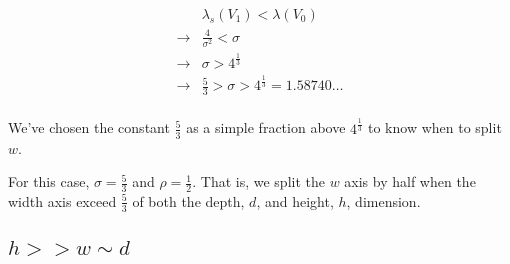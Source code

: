 $$
\begin{array}{ll}
  & \lambda_s (V_1) < \lambda(V_0) \\
  \to & \frac{4}{\sigma^2} < \sigma \\
  \to & \sigma > 4^{\frac{1}{3}} \\
  \to & \frac{5}{3} > \sigma > 4^{\frac{1}{3}} = 1.58740\dots \\
\end{array}
$$

We've chosen the constant $\frac{5}{3}$ as a simple fraction above $4^{\frac{1}{3}}$ to know when
to split $w$.

For this case, $\sigma = \frac{5}{3}$ and $\rho = \frac{1}{2}$.
That is, we split the $w$ axis by half when the width axis exceed $\frac{5}{3}$ of both the depth, $d$, and height, $h$, dimension.

\subsection{$h >> w \sim d$}


